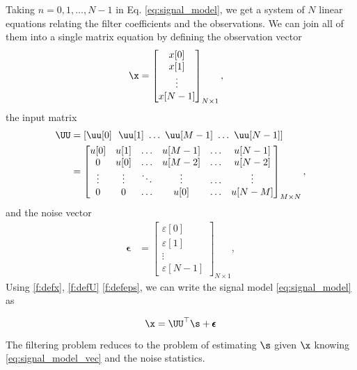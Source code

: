 Taking $n=0,1,\ldots,N-1$ in Eq. \eqref{eq:signal_model}, we get a system of $N$ linear equations relating the filter coefficients and the observations. We can join all of them into a single matrix equation by defining the observation vector
\begin{align}
\label{f:defx}
\x &= \begin{bmatrix}
                 x[0] \\ x[1] \\ \vdots \\ x[N-1]
      \end{bmatrix}_{N\times 1},
\end{align}
the input matrix
\begin{align}
\label{f:defU}
\UU &= [\uu[0]~~\uu[1]~\ldots~\uu[M-1]~\ldots~\uu[N-1] ]   \nonumber\\
    &= \begin{bmatrix}
                u[0]  & u[1]   & \ldots & u[M-1] & \ldots & u[N-1] \\
                0     & u[0]   & \ldots & u[M-2] & \ldots & u[N-2] \\
               \vdots & \vdots & \ddots & \vdots & \ldots & \vdots \\
               0      & 0      & \ldots & u[0]   & \ldots & u[N-M] 
       \end{bmatrix}_{M\times N},
\end{align}
and the noise vector
\begin{align}
\label{f:defeps}
\pmb{\epsilon} &= \begin{bmatrix}
                  \varepsilon[0] \\ \varepsilon[1] \\ \vdots \\ \varepsilon[N-1]
                  \end{bmatrix}_{N\times 1},
\end{align}
Using \eqref{f:defx}, \eqref{f:defU} \eqref{f:defeps}, we can write the signal model \eqref{eq:signal_model} as
\begin{framed}
\begin{equation}
\label{eq:signal_model_vec}
\x =\UU^\top \s + \pmb{\epsilon}
\end{equation}
\end{framed}

The filtering problem reduces to the problem of estimating $\s$ given $\x$ knowing \eqref{eq:signal_model_vec} and the noise statistics.

